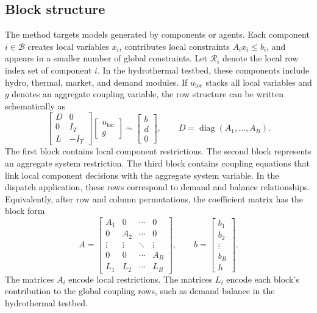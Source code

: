 \documentclass[AMA,Times1COL]{WileyNJDv5} %
\newcommand{\diag}{\operatorname{diag}}
\providecommand{\DIFadd}[1]{{\protect\color{blue} \sf #1}} %
\providecommand{\DIFaddbegin}{} %
\providecommand{\DIFaddend}{} %
\begin{document}
\subsection{Block structure}

The method targets models generated by components or agents. Each component
$i\in\mathcal{B}$ creates local variables $x_i$, contributes local constraints
$A_i x_i\le b_i$, and appears in a smaller number of global constraints. \DIFaddbegin \DIFadd{Let
$\mathcal{R}_i$ denote the local row index set of component $i$. }\DIFaddend In the hydrothermal
testbed, these components include hydro, thermal, market, and demand modules. If $u_{\mathrm{loc}}$ stacks all local variables and $g$ denotes an aggregate
coupling variable, the row structure can be written schematically as
\begin{equation}
\begin{bmatrix}
D & 0 \\
0 & I_T \\
L & -I_T
\end{bmatrix}
\begin{bmatrix}
u_{\mathrm{loc}} \\
g
\end{bmatrix}
\sim
\begin{bmatrix}
b \\
d \\
0
\end{bmatrix},
\qquad
D=\diag(A_1,\ldots,A_B).
\label{eq:compact-dispatch-structure}
\end{equation}
The first block contains local component restrictions. The second block represents an
aggregate system restriction. The third block contains coupling equations that link local
component decisions with the aggregate system variable. In the dispatch application,
these rows correspond to demand and balance relationships. Equivalently, after row and
column permutations, the coefficient matrix has the block form
\begin{equation}
A =
\begin{bmatrix}
A_1 & 0   & \cdots & 0 \\
0   & A_2 & \cdots & 0 \\
\vdots & \vdots & \ddots & \vdots \\
0   & 0   & \cdots & A_B \\
L_1 & L_2 & \cdots & L_B
\end{bmatrix},
\qquad
b =
\begin{bmatrix}
b_1\\ b_2\\ \vdots\\ b_B\\ h
\end{bmatrix}.
\label{eq:block-matrix}
\end{equation}
The matrices $A_i$ encode local restrictions. The matrices $L_i$ encode each block's contribution to the global coupling rows, such as demand balance in the hydrothermal
testbed.
\end{document}
